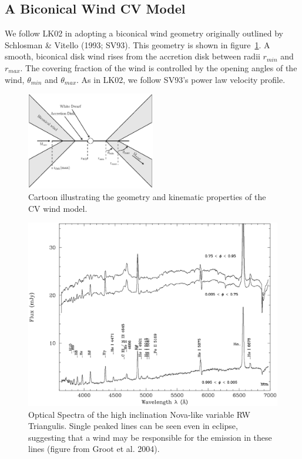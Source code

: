 \documentclass[useAMS,usenatbib,onecolumn]{mn2e2}
\begin{document}
\subsection{A Biconical Wind CV Model}

We follow LK02 in adopting a biconical wind geometry originally outlined by Schlosman \& Vitello (1993; SV93\nocite{SV93}).
This geometry is shown in figure~\ref{cartoon}. 
A smooth, biconical disk wind rises from the accretion disk between radii $r_{min}$ and $r_{max}$. 
The covering fraction of the wind is controlled by the opening angles of the wind, $\theta_{min}$ and 
$\theta_{max}$. As in LK02, we follow SV93's power law velocity profile. 

\begin{figure}
\centering
\includegraphics[width=0.5\textwidth]{figures/fig1.eps}
\caption{Cartoon illustrating the geometry and kinematic properties of the CV wind model.}
\label{cartoon}
\end{figure}

\begin{figure}
\centering
\includegraphics[width=1.0\textwidth]{figures/groot11.eps}
\caption{Optical Spectra of the high inclination Nova-like variable RW Triangulis.
Single peaked lines can be seen even in eclipse, suggesting that a wind may be responsible for 
the emission in these lines (figure from Groot et al. 2004).}
\label{spec}
\end{figure}
\end{document}
